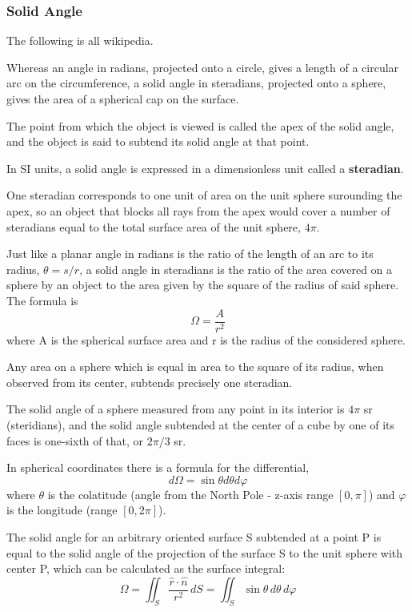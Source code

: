 
\subsubsection{Solid Angle}

The following is all wikipedia.

Whereas an angle in radians, projected onto a circle, gives a length of a circular arc
on the circumference, a solid angle in steradians, projected onto a sphere,
gives the area of a spherical cap on the surface.

The point from which the object is viewed is called the apex of the solid angle,
and the object is said to subtend its solid angle at that point.

In SI units, a solid angle is expressed in a dimensionless unit called a \textbf{steradian}.

One steradian corresponds to one unit of area on the unit sphere surounding the apex,
so an object that blocks all rays from the apex would cover a number of steradians equal
to the total surface area of the unit sphere, $4\pi$.


Just like a planar angle in radians is the ratio of the length of an arc to its radius, $\theta = s/r$,
a solid angle in steradians is the ratio of the area covered on a sphere by an object to the area given
by the square of the radius of said sphere. The formula is
$$
\Omega = \frac{A}{r^2}
$$
where A is the spherical surface area and r is the radius of the considered sphere.

Any area on a sphere which is equal in area to the square of its radius,
when observed from its center, subtends precisely one steradian.

The solid angle of a sphere measured from any point in its interior is $4\pi$ sr (steridians),
and the solid angle subtended at the center of a cube by one of its faces is one-sixth of that,
or $2\pi/3$ sr.

In spherical coordinates there is a formula for the differential,
$$
d\Omega = \sin \theta d\theta d\varphi 
$$
where $\theta$ is the colatitude (angle from the North Pole - z-axis range $[0,\pi]$)
and $\varphi$ is the longitude (range $[0,2\pi]$).

The solid angle for an arbitrary oriented surface S subtended at a point P is equal to
the solid angle of the projection of the surface S to the unit sphere with center P,
which can be calculated as the surface integral:
$$
\Omega =\iint _{S} \frac{\hat{r}\cdot\hat{n}}{r^2} \,dS
= \iint_{S} \sin \theta \,d\theta \,d\varphi
$$

